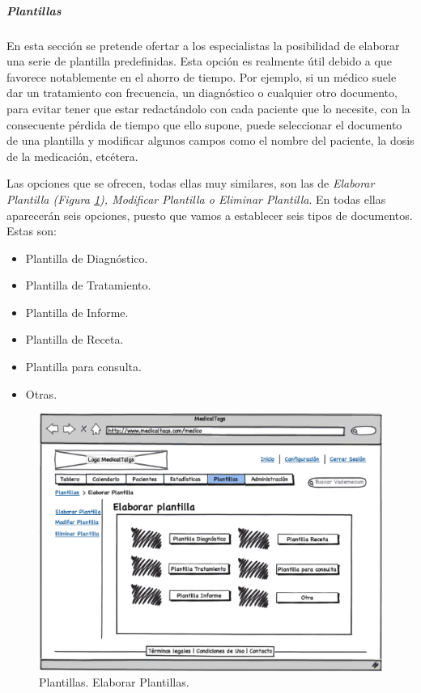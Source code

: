 \documentclass[a4paper,oneside,11pt]{book}
\begin{document}
		
		\bigskip
		\medskip
		\subparagraph{Plantillas} %
		\label{par:medico_plantillas}
		
		En esta sección se pretende ofertar a los especialistas la posibilidad de elaborar una serie de plantilla predefinidas. Esta opción es realmente útil debido a que favorece notablemente en el ahorro de tiempo. Por ejemplo, si un médico suele dar un tratamiento con frecuencia, un diagnóstico o cualquier otro documento, para evitar tener que estar redactándolo con cada paciente que lo necesite, con la consecuente pérdida de tiempo que ello supone, puede seleccionar el documento de una plantilla y modificar algunos campos como el nombre del paciente, la dosis de la medicación, etcétera.
		
		Las opciones que se ofrecen, todas ellas muy similares, son las de \textit{Elaborar Plantilla (Figura \ref{fig:plantillas_medico}), Modificar Plantilla o Eliminar Plantilla}. En todas ellas aparecerán seis opciones, puesto que vamos a establecer seis tipos de documentos. Estas son:
		
		\begin{itemize}
			\item Plantilla de Diagnóstico.
			\item Plantilla de Tratamiento.
			\item Plantilla de Informe.
			\item Plantilla de Receta.
			\item Plantilla para consulta.
			\item Otras.
		\end{itemize}
		
		\begin{figure}[H]
		  \centering
		    \includegraphics[width=12cm]{img/eps/18_Plantillas_Medico.eps}
		  \caption{Plantillas. Elaborar Plantillas.}
		  \label{fig:plantillas_medico}
		\end{figure}
		
\end{document}
